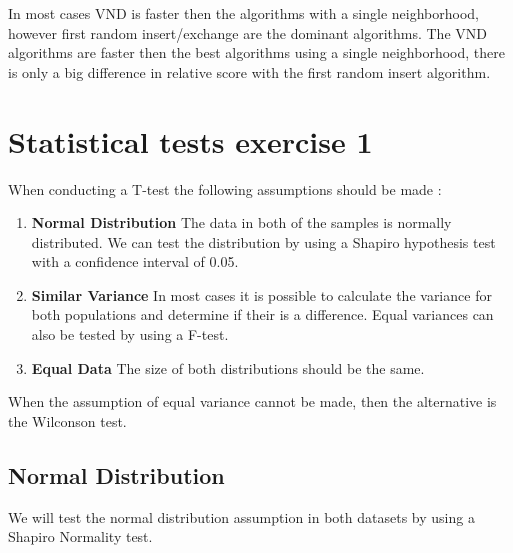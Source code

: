 \documentclass[]{article}
\begin{document}
	In most cases VND is faster then the algorithms with a single neighborhood, however first random insert/exchange are the dominant algorithms.
	The VND algorithms are faster then the best algorithms using a single neighborhood, there is only a big difference in relative score with the first random insert algorithm. 
	
	\section{Statistical tests exercise 1}
	
	
	
	
	
	When conducting a T-test the following assumptions should be made :
	
	\begin{enumerate}  
		\item \textbf{Normal Distribution}\newline
		The data in both of the samples is normally distributed.
		We can test the distribution by using a Shapiro hypothesis test with a confidence interval of 0.05.
		
		
		\item \textbf{Similar Variance}\newline
		In most cases it is possible to calculate the variance for both populations and determine if their is a difference.
		Equal variances can also be tested by using a F-test.
		
		
		\item \textbf{Equal Data}\newline
		The size of both distributions should be the same.
	\end{enumerate}
	
	
	When the assumption of equal variance cannot be made, then the alternative is the Wilconson test. 
	
	
	\subsection{Normal Distribution}
	We will test the normal distribution assumption in both datasets by using a Shapiro Normality test.
	
\end{document}
